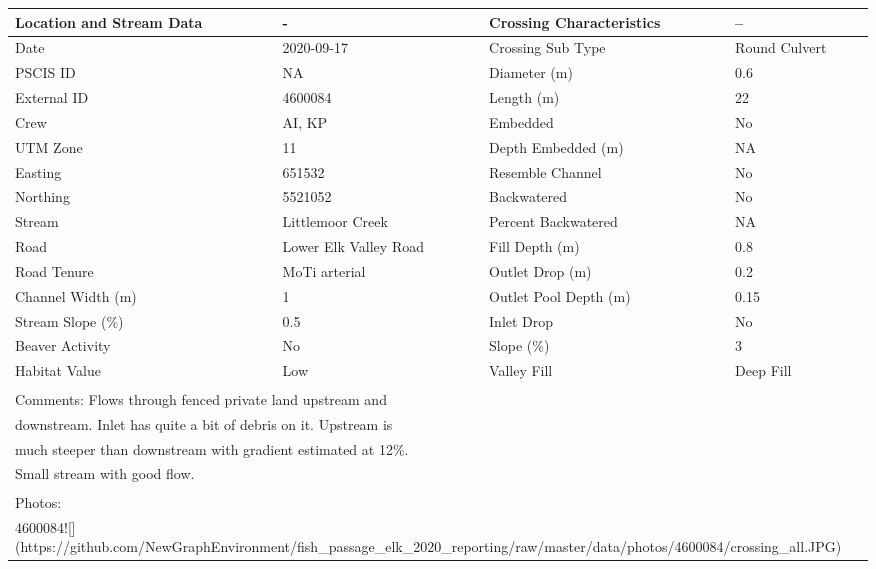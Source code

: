 \documentclass[
]{book}
\begin{document}
\begin{tabular}{l|l|l|l}
\hline
Location and Stream Data & - & Crossing Characteristics & --\\
\hline
Date & 2020-09-17 & Crossing Sub Type & Round Culvert\\
\hline
PSCIS ID & NA & Diameter (m) & 0.6\\
\hline
External ID & 4600084 & Length (m) & 22\\
\hline
Crew & AI, KP & Embedded & No\\
\hline
UTM Zone & 11 & Depth Embedded (m) & NA\\
\hline
Easting & 651532 & Resemble Channel & No\\
\hline
Northing & 5521052 & Backwatered & No\\
\hline
Stream & Littlemoor Creek & Percent Backwatered & NA\\
\hline
Road & Lower Elk Valley Road & Fill Depth (m) & 0.8\\
\hline
Road Tenure & MoTi arterial & Outlet Drop (m) & 0.2\\
\hline
Channel Width (m) & 1 & Outlet Pool Depth (m) & 0.15\\
\hline
Stream Slope (\%) & 0.5 & Inlet Drop & No\\
\hline
Beaver Activity & No & Slope (\%) & 3\\
\hline
Habitat Value & Low & Valley Fill & Deep Fill\\
\hline
\multicolumn{4}{l}{\textsuperscript{} Comments: Flows through fenced private land upstream and}\\
\multicolumn{4}{l}{downstream. Inlet has quite a bit of debris on it. Upstream is}\\
\multicolumn{4}{l}{much steeper than downstream with gradient estimated at 12\%.}\\
\multicolumn{4}{l}{Small stream with good flow.}\\
\multicolumn{4}{l}{\textsuperscript{} Photos:}\\
\multicolumn{4}{l}{4600084![](https://github.com/NewGraphEnvironment/fish\_passage\_elk\_2020\_reporting/raw/master/data/photos/4600084/crossing\_all.JPG)}\\
\end{tabular}
\end{document}
